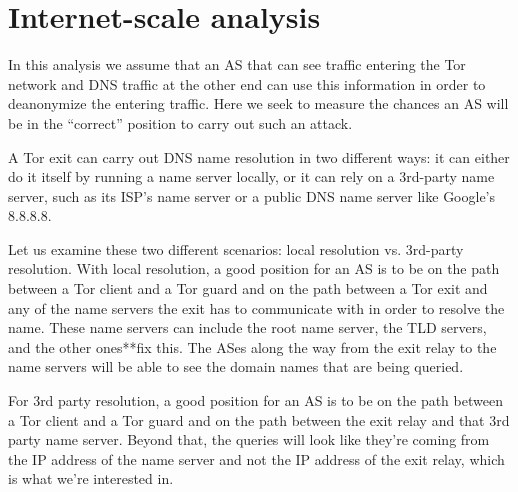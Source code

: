 \section{Internet-scale analysis}
\label{sec:internet-scale}
In this analysis we assume that an AS that can see traffic entering the Tor network and 
DNS traffic at the other end can use this information in order to deanonymize the 
entering traffic. Here we seek to measure the chances an AS will be in the ``correct'' 
position to carry out such an attack.

A Tor exit can carry out DNS name resolution in two different ways: it can either do it
itself by running a name server locally, or it can rely on a 3rd-party name server, 
such as its ISP's name server or a public DNS name server like Google's 8.8.8.8.

Let us examine these two different scenarios: local resolution vs. 3rd-party 
resolution. With local resolution, a good position for an AS is to be on the path between 
a Tor client and a Tor guard and on the path between a Tor exit and any of the name 
servers the exit has to communicate with in order to resolve the name. These name servers 
can include the root name server, the TLD servers, and the other ones**fix this. The ASes 
along the way from the exit relay to the name servers will be able to see the domain 
names that are being queried.

For 3rd party resolution, a good position for an AS is to be on the path between 
a Tor client and a Tor guard and on the path between the exit relay and that 3rd party 
name server. Beyond that, the queries will look like they're coming from the IP address 
of the name server and not the IP address of the exit relay, which is what we're interested 
in.

